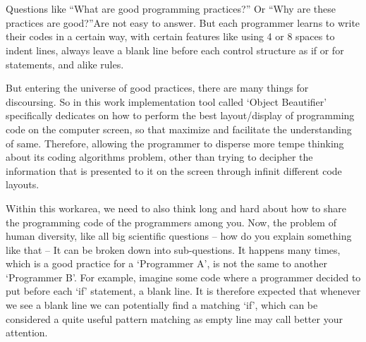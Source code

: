 

%
\cleardoublepage
{}


\chapter{}


\chooselang
{
    Questions like ``What are good programming practices?'' Or ``Why are these practices are
    good?''Are not easy to answer. But each programmer learns to write their codes in a certain way,
    with certain features like using 4 or 8 spaces to indent lines, always leave a blank line before
    each control structure as if or for statements, and alike rules. \cite{industrialApplication}

    But entering the universe of good practices, there are many things for discoursing. So in this
    work implementation tool called `Object Beautifier' specifically dedicates on how to perform the
    best layout/display of programming code on the computer screen, so that maximize and facilitate
    the understanding of same. Therefore, allowing the programmer to disperse more tempe thinking
    about its coding algorithms problem, other than trying to decipher the information that is
    presented to it on the screen through infinit different code layouts. \cite{programIndentation}

    Within this work\s area, we need to also think long and hard about how to share the programming
    code of the programmers among you. Now, the problem of human diversity, like all big scientific
    questions -- how do you explain something like that -- It can be broken down into sub-questions.
    It happens many times, which is a good practice for a `Programmer A', is not the same to another
    `Programmer B'. For example, imagine some code where a programmer decided to put before each
    `if' statement, a blank line. It is therefore expected that whenever we see a blank line we can
    potentially find a matching `if', which can be considered a quite useful pattern matching as
    empty line may call better your attention. \cite{independentFramework}

}
